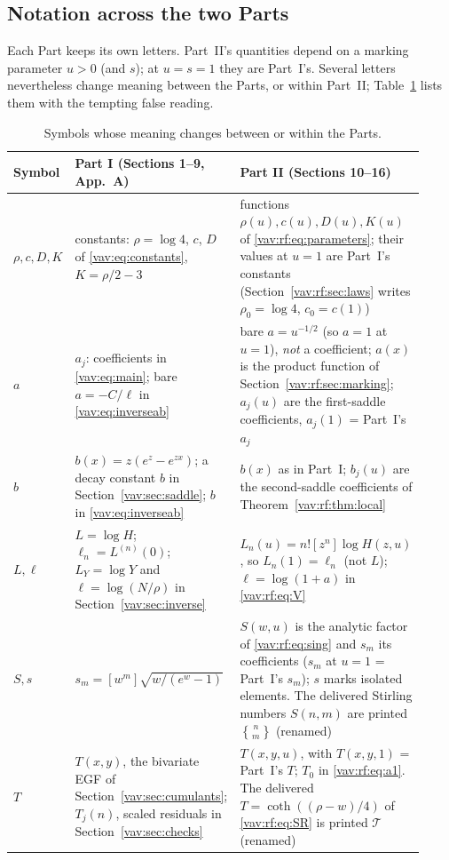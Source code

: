 \documentclass[11pt]{article}
\theoremstyle{remark}\newtheorem{remark}[theorem]{Remark}
\newcommand{\stirling}[2]{\genfrac\{\}{0pt}{}{#1}{#2}}
\begin{document}
\subsection*{Notation across the two Parts}
Each Part keeps its own letters. Part~II's quantities depend on a marking
parameter $u>0$ (and $s$); at $u=s=1$ they are Part~I's. Several letters
nevertheless change meaning between the Parts, or within Part~II;
Table~\ref{vav:tab:notation} lists them with the tempting false reading.
\begin{table}[H]
\centering\small
\caption{Symbols whose meaning changes between or within the Parts.}
\label{vav:tab:notation}
\begin{tabular}{@{}>{\raggedright}p{0.13\linewidth}>{\raggedright}p{0.36\linewidth}>{\raggedright\arraybackslash}p{0.43\linewidth}@{}}
\toprule
Symbol & Part I (Sections 1--9, App.~A) & Part II (Sections 10--16)\\\midrule
$\rho,c,D,K$ & constants: $\rho=\log4$, $c$, $D$ of \eqref{vav:eq:constants}, $K=\rho/2-3$ & functions $\rho(u),c(u),D(u),K(u)$ of \eqref{vav:rf:eq:parameters}; their values at $u=1$ are Part~I's constants (Section~\ref{vav:rf:sec:laws} writes $\rho_0=\log4$, $c_0=c(1)$)\\
$a$ & $a_j$: coefficients in \eqref{vav:eq:main}; bare $a=-C/\ell$ in \eqref{vav:eq:inverseab} & bare $a=u^{-1/2}$ (so $a=1$ at $u=1$), \emph{not} a coefficient; $a(x)$ is the product function of Section~\ref{vav:rf:sec:marking}; $a_j(u)$ are the first-saddle coefficients, $a_j(1)$ = Part~I's $a_j$\\
$b$ & $b(x)=z(e^z-e^{zx})$; a decay constant $b$ in Section~\ref{vav:sec:saddle}; $b$ in \eqref{vav:eq:inverseab} & $b(x)$ as in Part~I; $b_j(u)$ are the second-saddle coefficients of Theorem~\ref{vav:rf:thm:local}\\
$L,\ell$ & $L=\log H$; $\ell_n=L^{(n)}(0)$; $L_Y=\log Y$ and $\ell=\log(N/\rho)$ in Section~\ref{vav:sec:inverse} & $L_n(u)=n![z^n]\log H(z,u)$, so $L_n(1)=\ell_n$ (not $L$); $\ell=\log(1+a)$ in \eqref{vav:rf:eq:V}\\
$S,s$ & $s_m=[w^m]\sqrt{w/(e^w-1)}$ & $S(w,u)$ is the analytic factor of \eqref{vav:rf:eq:sing} and $s_m$ its coefficients ($s_m$ at $u=1$ = Part~I's $s_m$); $s$ marks isolated elements. The delivered Stirling numbers $S(n,m)$ are printed $\stirling{n}{m}$ (renamed)\\
$T$ & $T(x,y)$, the bivariate EGF of Section~\ref{vav:sec:cumulants}; $T_j(n)$, scaled residuals in Section~\ref{vav:sec:checks} & $T(x,y,u)$, with $T(x,y,1)$ = Part~I's $T$; $T_0$ in \eqref{vav:rf:eq:a1}. The delivered $T=\coth((\rho-w)/4)$ of \eqref{vav:rf:eq:SR} is printed $\mathcal T$ (renamed)\\

\end{tabular}
\end{table}
\end{document}
